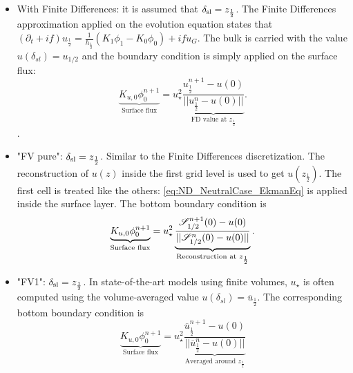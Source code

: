   \begin{itemize}
	  \item With Finite Differences:
		  it is assumed that
		  $\delta_{\rm sl} = z_{\frac{1}{2}}$.
		The Finite Differences approximation applied on
		  the evolution equation states that
		  $(\partial_t+if) u_{\frac{1}{2}}
		  =\frac{1}{h_{\frac{1}{2}}}(K_1\phi_1 - K_0\phi_0)
		  + if u_G$.
		  The bulk is carried with the value
		  $u(\delta_{sl}) = u_{1/2}$ and the boundary
		  condition is simply applied on the surface flux:
		\begin{equation}
		\underbrace{K_{u,0} \phi_0^{n+1}}_{\text{Surface flux}}
		= u_\star^2 
			\underbrace{\frac{u_{\frac{1}{2}}^{n+1} - u(0)}
			{||u_{\frac{1}{2}}^n - u(0)||}}_{
			  \text{FD value at } z_{\frac{1}{2}}
		  }.
		\end{equation}
		  .
	  \item "FV pure": $\delta_{\rm sl} = z_{\frac{1}{2}}$.
		  Similar to the Finite Differences discretization.
	    The reconstruction of $u(z)$ inside the first grid level
		  is used to get $u(z_{\frac{1}{2}})$.
		  The first cell is treated like the others:
		  \eqref{eq:ND_NeutralCase_EkmanEq} is
		  applied inside the surface layer.
	The bottom boundary condition is
	\begin{equation}
		\underbrace{K_{u,0} \phi_0^{n+1}}_{\text{Surface flux}}
		= u_\star^2 
		  \underbrace{\frac{{\cal S}_{1/2}^{n+1}(0) - u(0)}
		  {||{\cal S}_{1/2}^n(0) - u(0)||}}_{
			  \text{Reconstruction at } z_{\frac{1}{2}}
		  }.
	\end{equation}
	  \item "FV1": $\delta_{\rm sl} = z_{\frac{1}{2}}$.
		  In state-of-the-art models using finite volumes,
		  $u_{\star}$ is often computed using the
		  volume-averaged value
		  $u(\delta_{sl}) = \overline{u}_{\frac{1}{2}}$.
		The corresponding bottom boundary condition is
		  \begin{equation}
	\underbrace{K_{u,0} \phi_0^{n+1}}_{\text{Surface flux}}
			  = u_\star^2 
			  \underbrace{\frac{
				  \overline{u}^{n+1}_{\frac{1}{2}}
				  -u(0)}
			  {||\overline{u}_{\frac{1}{2}}^n - u(0)||}
			  }_{\text{Averaged around } z_{\frac{1}{2}}
			  }
		  \end{equation}


\end{itemize}
